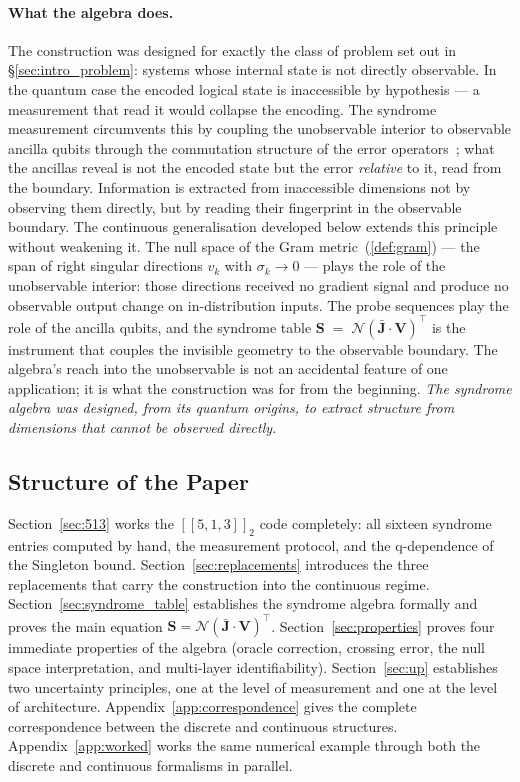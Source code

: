 \documentclass[11pt,a4paper]{article}
\theoremstyle{definition}
\newcommand{\Vm}{\mathbf{V}}
\newcommand{\Sm}{\mathbf{S}}
\newcommand{\Jm}{\mathbf{J}}
\newcommand{\Nop}{\mathcal{N}}
\begin{document}
\paragraph{What the algebra does.}
The construction was designed for exactly the class of problem set out in \S\ref{sec:intro_problem}: systems whose internal state is not directly observable. In the quantum case the encoded logical state is inaccessible by hypothesis --- a measurement that read it would collapse the encoding. The syndrome measurement circumvents this by coupling the unobservable interior to observable ancilla qubits through the commutation structure of the error operators~\cite{NielsenChuang2000, Gottesman1997, Laflamme1996, Bennett1996, Knill1997}; what the ancillas reveal is not the encoded state but the error \emph{relative} to it, read from the boundary. Information is extracted from inaccessible dimensions not by observing them directly, but by reading their fingerprint in the observable boundary. The continuous generalisation developed below extends this principle without weakening it. The null space of the Gram metric~(\ref{def:gram}) --- the span of right singular directions $v_k$ with $\sigma_k \to 0$ --- plays the role of the unobservable interior: those directions received no gradient signal and produce no observable output change on in-distribution inputs. The probe sequences play the role of the ancilla qubits, and the syndrome table $\Sm \;=\; \Nop\!\left(\bar{\Jm}\cdot\Vm\right)^{\!\top}$ is the instrument that couples the invisible geometry to the observable boundary. The algebra's reach into the unobservable is not an accidental feature of one application; it is what the construction was for from the beginning. \emph{The syndrome algebra was designed, from its quantum origins, to extract structure from dimensions that cannot be observed directly.}

\subsection{Structure of the Paper}
\label{sec:intro_structure}

Section~\ref{sec:513} works the $[\![5,1,3]\!]_2$ code completely: all sixteen syndrome entries computed by hand, the measurement protocol, and the q-dependence of the Singleton bound. Section~\ref{sec:replacements} introduces the three replacements that carry the construction into the continuous regime. Section~\ref{sec:syndrome_table} establishes the syndrome algebra formally and proves the main equation $\Sm = \Nop(\bar{\Jm}\cdot\Vm)^\top$. Section~\ref{sec:properties} proves four immediate properties of the algebra (oracle correction, crossing error, the null space interpretation, and multi-layer identifiability). Section~\ref{sec:up} establishes two uncertainty principles, one at the level of measurement and one at the level of architecture. Appendix~\ref{app:correspondence} gives the complete correspondence between the discrete and continuous structures. Appendix~\ref{app:worked} works the same numerical example through both the discrete and continuous formalisms in parallel.
\end{document}
